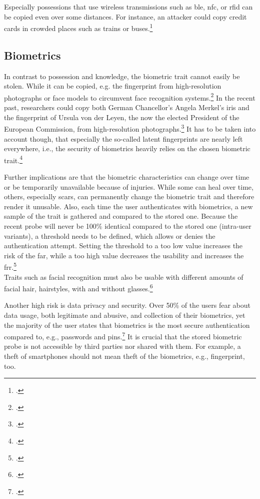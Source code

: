 Especially possessions that use wireless transmissions such as \gls{ble}, \gls{nfc}, or \gls{rfid} can be copied even over some distances. For instance, an attacker could copy credit cards in crowded places such as trains or buses.\footcite{6892730}

\subsection{Biometrics}

In contrast to possession and knowledge, the biometric trait cannot easily be stolen. While it can be copied, e.g. the fingerprint from high-resolution photographs or 
face models to circumvent face recognition systems.\footcites[][]{185181}[][]{220566} In the recent past, researchers could copy both German Chancellor's Angela Merkel's iris and the fingerprint of Ursula von der Leyen, the now the elected President of the European Commission, from high-resolution photographs.\footcite{ccc-merkel} It has to be taken into account though, that especially the so-called latent fingerprints are nearly left everywhere, i.e., the security of biometrics heavily relies on the chosen biometric trait.\footcite[See][299]{Vacca2017aa}

Further implications are that the biometric characteristics can change over time or be temporarily unavailable because of injuries. While some can heal over time, others, especially scars, can permanently change the biometric trait and therefore render it unusable. Also, each time the user authenticates with biometrics, a new sample of the trait is gathered and compared to the stored one. Because the recent probe will never be 100\% identical compared to the stored one (\frqq intra-user variants\flqq), a threshold needs to be defined, which allows or denies the authentication attempt. Setting the threshold to a too low value increases the risk of the \gls{far}, while a too high value decreases the usability and increases the \gls{frr}.\footcite[See][13--17, 52]{Jain2011}\\Traits such as facial recognition must also be usable with different amounts of facial hair, hairstyles, with and without glasses.\footcite[See][98]{Jain2011}

Another high risk is data privacy and security. Over 50\% of the users fear about data usage, both legitimate and abusive, and collection of their biometrics, yet the majority of the user states that biometrics is the most secure authentication compared to, e.g., passwords and \glspl{pin}.\footcite[See][8]{ibm-security} It is crucial that the stored biometric probe is not accessible by third parties nor shared with them. For example, a theft of smartphones should not mean theft of the biometrics, e.g., fingerprint, too.


